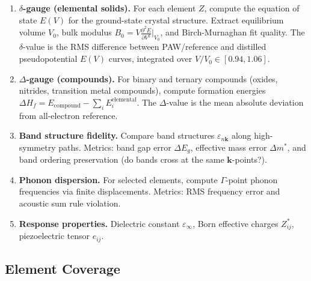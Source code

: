 \documentclass[11pt,a4paper]{article}
\theoremstyle{definition}
\begin{document}
\begin{enumerate}[label=\textbf{B\arabic*:},leftmargin=*]
    \item \textbf{$\delta$-gauge (elemental solids).} For each element $Z$, compute the equation of state $E(V)$ for the ground-state crystal structure. Extract equilibrium volume $V_0$, bulk modulus $B_0 = V \frac{\partial^2 E}{\partial V^2}|_{V_0}$, and Birch-Murnaghan fit quality. The $\delta$-value is the RMS difference between PAW/reference and distilled pseudopotential $E(V)$ curves, integrated over $V/V_0 \in [0.94, 1.06]$.

    \item \textbf{$\Delta$-gauge (compounds).} For binary and ternary compounds (oxides, nitrides, transition metal compounds), compute formation energies $\Delta H_f = E_{\mathrm{compound}} - \sum_i E_i^{\mathrm{elemental}}$. The $\Delta$-value is the mean absolute deviation from all-electron reference.

    \item \textbf{Band structure fidelity.} Compare band structures $\varepsilon_{n\mathbf{k}}$ along high-symmetry paths. Metrics: band gap error $\Delta E_g$, effective mass error $\Delta m^*$, and band ordering preservation (do bands cross at the same $\mathbf{k}$-points?).

    \item \textbf{Phonon dispersion.} For selected elements, compute $\Gamma$-point phonon frequencies via finite displacements. Metrics: RMS frequency error and acoustic sum rule violation.

    \item \textbf{Response properties.} Dielectric constant $\varepsilon_\infty$, Born effective charges $Z^*_{ij}$, piezoelectric tensor $e_{ij}$.
\end{enumerate}

\subsection{Element Coverage}
\end{document}
